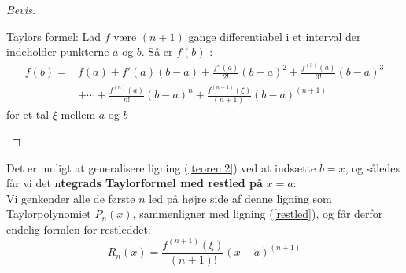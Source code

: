 \documentclass[12pt, a4paper]{article}
\begin{document}
\begin{refsection}
\begin{proof}[Bevis]
\begin{mdframed}
     Taylors formel: Lad $f$ være $(n+1)$ gange differentiabel i et interval der indeholder punkterne  $a$ og $b$. Så er $f(b)$ :
     \begin{equation}\label{teorem2}
         \begin{aligned}
            f(b)=&f(a)+f'(a)(b-a)+\frac{f''(a)}{2!}(b-a)^2+\frac{f^{(3)}(a)}{3!}(b-a)^3\\
                 &+\cdots+\frac{f^{(n)}(a)}{n!}(b-a)^n+\frac{f^{(n+1)}(\xi)}{(n+1)!}(b-a)^{(n+1)}
        \end{aligned}
        \end{equation}
        for et tal $\xi$ mellem $a$ og $b$
     \end{mdframed}
     \end{proof}
 Det er muligt at generalisere ligning (\ref{teorem2}) ved at indsætte $b=x$, og således får vi det n\textbf{tegrads Taylorformel med restled på}  $x=a$:\\
     Vi genkender alle de første $n$ led på højre side af denne ligning som Taylorpolynomiet $P_n(x)$, sammenligner med ligning (\ref{restled}), og får derfor endelig formlen for restleddet:
     \begin{equation*}
         R_n(x)=\frac{f^{(n+1)}(\xi)}{(n+1)!}(x-a)^{(n+1)}
     \end{equation*}

\end{refsection}
\end{document}
